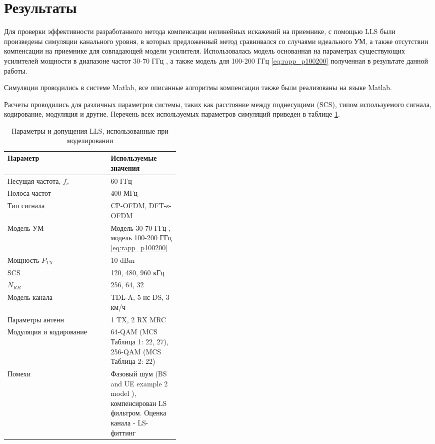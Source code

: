 \section{Результаты}
\label{sec:results}
Для проверки эффективности разработанного метода компенсации нелинейных
искажений на приемнике, с помощью LLS были произведены симуляции канального
уровня, в которых предложенный метод сравнивался со случаями идеального УМ,
а также отсутствии компенсации на приемнике для совпадающей модели
усилителя. Использовалась модель основанная на параметрах существующих
усилителей мощности в диапазоне частот 30-70 ГГц \cite{nokia163314}, а
также модель для 100-200 ГГц \ref{eq:rapp_p100200} полученная в результате
данной работы.

Симуляции проводились в системе Matlab, все описанные алгоритмы компенсации
также были реализованы на языке Matlab.

Расчеты проводились для различных параметров системы, таких как расстояние
между поднесущими (SCS), типом используемого сигнала, кодирование,
модуляция и другие. Перечень всех используемых параметров симуляций
приведен в таблице \ref{tab:lls_parameters}.
\begin{table}[h!]
    \centering
    \bgroup
    \def\arraystretch{1.5}
    \begin{tabular}{l|p{0.4\linewidth}}
    Параметр & Используемые значения \\ \hline
    Несущая частота, $f_c$ & 60 ГГц   \\ \hline
    Полоса частот &  400 МГц  \\ \hline
    Тип сигнала &  CP-OFDM, DFT-s-OFDM  \\ \hline
    Модель УМ  &  Модель 30-70 ГГц \cite{nokia163314}, модель 100-200 ГГц \ref{eq:rapp_p100200}   \\ \hline
    Мощность $P_{TX}$ &  10 dBm  \\ \hline
    SCS &  120, 480, 960 кГц  \\ \hline
    $N_{RB}$ &  256, 64, 32  \\ \hline
    Модель канала &  TDL-A, 5 нс DS, 3 км/ч  \\ \hline
    Параметры антенн &  1 TX, 2 RX MRC  \\ \hline
    Модуляция и кодирование &  64-QAM (MCS Таблица 1: 22, 27), 256-QAM (MCS Таблица 2: 22)  \\ \hline
    Помехи &  Фазовый шум (BS and UE example 2 model \cite{3gpp.38.803}),
    компенсирован LS фильтром. Оценка канала - LS-фиттинг
    \end{tabular}
    \egroup
    \caption{Параметры и допущения LLS, использованные при моделировании}
    \label{tab:lls_parameters}
\end{table}

